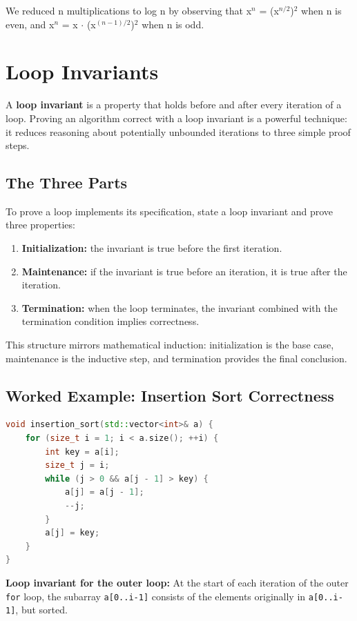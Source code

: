 We reduced n multiplications to log n by observing that x$^{n}$ = (x$^{n/2}$)$^{2}$ when n is even, and x$^{n}$ = x $\cdot$ (x$^{(n-1)/2}$)$^{2}$ when n is odd.

\section{Loop Invariants}

A \textbf{loop invariant} is a property that holds before and after every iteration of a loop. Proving an algorithm correct with a loop invariant is a powerful technique: it reduces reasoning about potentially unbounded iterations to three simple proof steps.

\subsection{The Three Parts}

To prove a loop implements its specification, state a loop invariant and prove three properties:
\begin{enumerate}
\item \textbf{Initialization:} the invariant is true before the first iteration.
\item \textbf{Maintenance:} if the invariant is true before an iteration, it is true after the iteration.
\item \textbf{Termination:} when the loop terminates, the invariant combined with the termination condition implies correctness.
\end{enumerate}

This structure mirrors mathematical induction: initialization is the base case, maintenance is the inductive step, and termination provides the final conclusion.

\subsection{Worked Example: Insertion Sort Correctness}

\begin{lstlisting}[language=C++]
void insertion_sort(std::vector<int>& a) {
    for (size_t i = 1; i < a.size(); ++i) {
        int key = a[i];
        size_t j = i;
        while (j > 0 && a[j - 1] > key) {
            a[j] = a[j - 1];
            --j;
        }
        a[j] = key;
    }
}
\end{lstlisting}

\textbf{Loop invariant for the outer loop:} At the start of each iteration of the outer \texttt{for} loop, the subarray \texttt{a[0..i-1]} consists of the elements originally in \texttt{a[0..i-1]}, but sorted.

